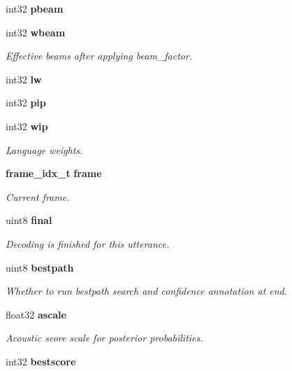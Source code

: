 \begin{DoxyCompactItemize}
\item 
int32 {\bfseries pbeam}\label{structfsg__search__s_a373ffd62c4bcb07a6f28378ea33161e1}

\item 
int32 {\bf wbeam}\label{structfsg__search__s_af28ddecbb5115a50712c61f8a72dcf51}

\begin{DoxyCompactList}\small\item\em Effective beams after applying beam\-\_\-factor. \end{DoxyCompactList}\item 
int32 {\bfseries lw}\label{structfsg__search__s_a77c1f7f228ca66e48fb05e1ac2b2714a}

\item 
int32 {\bfseries pip}\label{structfsg__search__s_a2163d2c02c2dfe84a83c10fdb2d330a3}

\item 
int32 {\bf wip}\label{structfsg__search__s_ae9ddc3b50d0f164926392f8ab4b019a0}

\begin{DoxyCompactList}\small\item\em Language weights. \end{DoxyCompactList}\item 
{\bf frame\-\_\-idx\-\_\-t} {\bf frame}
\begin{DoxyCompactList}\small\item\em Current frame. \end{DoxyCompactList}\item 
uint8 {\bf final}
\begin{DoxyCompactList}\small\item\em Decoding is finished for this utterance. \end{DoxyCompactList}\item 
uint8 {\bf bestpath}
\begin{DoxyCompactList}\small\item\em Whether to run bestpath search and confidence annotation at end. \end{DoxyCompactList}\item 
float32 {\bf ascale}
\begin{DoxyCompactList}\small\item\em Acoustic score scale for posterior probabilities. \end{DoxyCompactList}\item 
int32 {\bf bestscore}\label{structfsg__search__s_a52880ad440412d76f7aae7e05977ba4b}


\end{DoxyCompactItemize}
